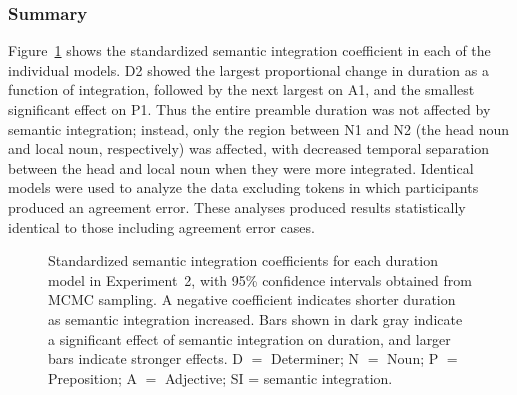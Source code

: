\documentclass[12pt,titlepage]{article}
\newcommand{\framefig}[1]{#1}
\begin{document}






\subsubsection{Summary} Figure~\ref{DurationResults} shows the standardized semantic integration coefficient in each of the individual models. D2 showed the largest proportional change in duration as a function of integration, followed by the next largest on A1, and the smallest significant effect on P1. Thus the entire preamble duration was not affected by semantic integration; instead, only the region between N1 and N2 (the head noun and local noun, respectively) was affected, with decreased temporal separation between the head and local noun when they were more integrated. Identical models were used to analyze the data excluding tokens in which participants produced an agreement error. These analyses produced results statistically identical to those including agreement error cases.

{\begin{figure}[tb]
%
    \makebox[\textwidth][c]{\framefig{\texttt{[image: DurationResults]}}}

    \caption{Standardized semantic integration coefficients for each duration model in Experiment~2, with 95\% confidence intervals obtained from MCMC sampling. A negative coefficient indicates shorter duration as semantic integration increased. Bars shown in dark gray indicate a significant effect of semantic integration on duration, and larger bars indicate stronger effects. D $=$ Determiner; N $=$ Noun; P $=$ Preposition; A $=$ Adjective; SI = semantic integration.}

\label{DurationResults}
\end{figure}}
\end{document}

